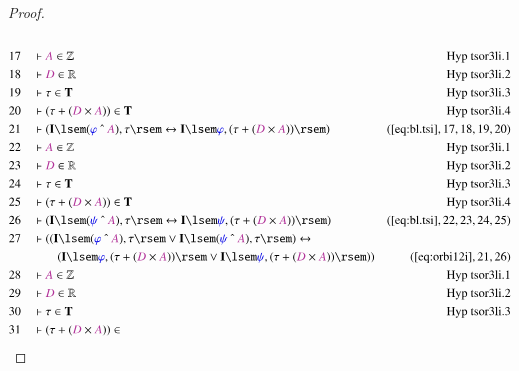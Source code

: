 \begin{proof}
\begin{align}
  \\ 17 &&  & \vdash \mc{A} \in
      \mathbb{Z}&\text{Hyp~tsor3li.1}\notag%
  \\ 18 &&  & \vdash \mc{D} \in
      \mathbb{R}&\text{Hyp~tsor3li.2}\notag%
  \\ 19 &&  & \vdash \tau \in
      \mathbf{T}&\text{Hyp~tsor3li.3}\notag%
  \\ 20 &&  & \vdash ( \tau + ( \mc{D} \times \mc{A} ) ) \in
      \mathbf{T}&\text{Hyp~tsor3li.4}\notag%
  \\ 21 &&  & \vdash ( \mathbf{I} \lsem ( \mw{\varphi} ~\string^~ \mc{A} ) ,
      \tau \rsem \leftrightarrow \mathbf{I} \lsem
      \mw{\varphi} , ( \tau + ( \mc{D} \times \mc{A} ) )
      \rsem )&(\mbox{\ref{eq:bl.tsi}},17,18,19,20)\notag
  \\ 22 &&  & \vdash \mc{A} \in
      \mathbb{Z}&\text{Hyp~tsor3li.1}\notag%
  \\ 23 &&  & \vdash \mc{D} \in
      \mathbb{R}&\text{Hyp~tsor3li.2}\notag%
  \\ 24 &&  & \vdash \tau \in
      \mathbf{T}&\text{Hyp~tsor3li.3}\notag%
  \\ 25 &&  & \vdash ( \tau + ( \mc{D} \times \mc{A} ) ) \in
      \mathbf{T}&\text{Hyp~tsor3li.4}\notag%
  \\ 26 &&  & \vdash ( \mathbf{I} \lsem ( \mw{\psi} ~\string^~ \mc{A} ) , \tau
      \rsem \leftrightarrow \mathbf{I} \lsem \mw{\psi} , (
      \tau + ( \mc{D} \times \mc{A} ) ) \rsem
      )&(\mbox{\ref{eq:bl.tsi}},22,23,24,25)\notag
  \\ 27 &&  & \vdash ( ( \mathbf{I} \lsem ( \mw{\varphi} ~\string^~ \mc{A} ) ,
      \tau \rsem \vee \mathbf{I} \lsem ( \mw{\psi}
      ~\string^~ \mc{A} ) , \tau \rsem ) \leftrightarrow  \notag \\ & & & \qquad
     (
      \mathbf{I} \lsem \mw{\varphi} , ( \tau + ( \mc{D}
      \times \mc{A} ) ) \rsem \vee \mathbf{I} \lsem
      \mw{\psi} , ( \tau + ( \mc{D} \times \mc{A} ) ) \rsem
      ) )&(\mbox{\ref{eq:orbi12i}},21,26)\notag
  \\ 28 &&  & \vdash \mc{A} \in
      \mathbb{Z}&\text{Hyp~tsor3li.1}\notag%
  \\ 29 &&  & \vdash \mc{D} \in
      \mathbb{R}&\text{Hyp~tsor3li.2}\notag%
  \\ 30 &&  & \vdash \tau \in
      \mathbf{T}&\text{Hyp~tsor3li.3}\notag%
  \\ 31 &&  & \vdash ( \tau + ( \mc{D} \times \mc{A} ) ) \in

\end{align}
\end{proof}

